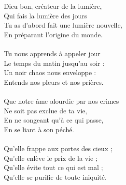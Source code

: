 Dieu bon, créateur de la lumière,\\
Qui fais la lumière des jours\\
Tu as d'abord fait une lumière nouvelle,\\
En préparant l'origine du monde.\\
\\
Tu nous apprends à appeler jour\\
Le temps du matin jusqu'au soir :\\
Un noir chaos nous enveloppe :\\
Entends nos pleurs et nos prières.\\
\\
Que notre âme alourdie par nos crimes\\
Ne soit pas exclue de ta vie,\\
En ne songeant qu’à ce qui passe,\\
En se liant à son péché.\\
\\
Qu'elle frappe aux portes des cieux ;\\
Qu'elle enlève le prix de la vie ;\\
Qu'elle évite tout ce qui est mal ;\\
Qu'elle se purifie de toute iniquité.